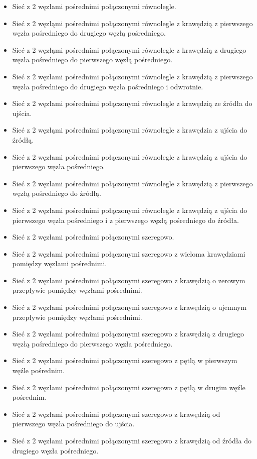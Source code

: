 \documentclass[10pt]{dokument-tiwo}
\begin{document}
\begin{itemize}
    \item Sieć z 2 węzłami pośrednimi połączonymi równolegle.
    \item Sieć z 2 węzłąmi pośrednimi połączonymi równolegle z krawędzią z pierwszego węzła pośredniego do drugiego węzłą pośredniego.%
    \item Sieć z 2 węzłąmi pośrednimi połączonymi równolegle z krawędzią z drugiego węzła pośredniego do pierwszego węzłą pośredniego.%
    \item Sieć z 2 węzłami pośrednimi połączonymi równolegle z krawędzią z pierwszego węzła pośredniego do drugiego węzła pośredniego i odwrotnie.%
    \item Sieć z 2 węzłami pośrednimi połączonymi równolegle z krawędzią ze źródła do ujścia.
    \item Sieć z 2 węzłąmi pośrednimi połączonymi równolegle z krawędzia z ujścia do źródłą.
    \item Sieć z 2 węzłami pośrednimi połączonymi równolegle z krawędzią z ujścia do pierwszego węzła pośredniego.
    \item Sieć z 2 węzłami pośrednimi połączonymi równolegle z krawędzią z pierwszego węzłą pośredniego do źródłą.
    \item Sieć z 2 węzłami pośrednimi połączonymi równolegle z krawędzią z ujścia do pierwszego węzła pośredniego i z pierwszego węzłą pośredniego do źródła.
\end{itemize}
\begin{itemize}
    \item Sieć z 2 węzłami pośrednimi połączonymi szeregowo.
    \item Sieć z 2 węzłami pośrednimi połączonymi szeregowo z wieloma krawędziami pomiędzy węzłami pośrednimi.
    \item Sieć z 2 węzłami pośrednimi połączonymi szeregowo z krawędzią o zerowym przepływie pomiędzy węzłami pośrednimi.
    \item Sieć z 2 węzłami pośrednimi połączonymi szeregowo z krawędzią o ujemnym przepływie pomiędzy węzłami pośrednimi.
    \item Sieć z 2 węzłami pośrednimi połączonymi szeregowo z krawędzią z drugiego węzłą pośredniego do pierwszego węzła pośredniego.
    \item Sieć z 2 węzłami pośrednimi połączonymi szeregowo z pętlą w pierwszym węźle pośrednim.
    \item Sieć z 2 węzłami pośrednimi połączonymi szeregowo z pętlą w drugim węźle pośrednim.
    \item Sieć z 2 węzłami pośrednimi połączonymi szeregowo z krawędzią od pierwszego węzła pośredniego do ujścia.
    \item Sieć z 2 węzłami pośrednimi połączonymi szeregowo z krawędzią od źródła do drugiego węzła pośredniego.
\end{itemize}
\end{document}
